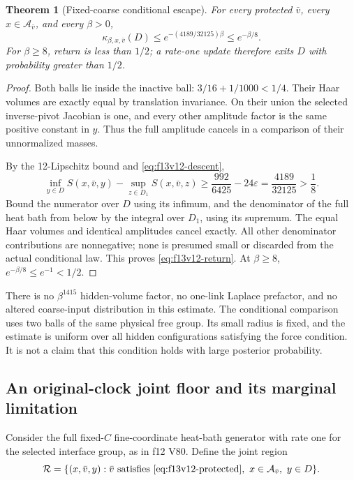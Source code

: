 \documentclass[11pt,oneside]{article}
\newtheorem{theorem}{Theorem}[section]
\begin{document}
\begin{theorem}[Fixed-coarse conditional escape]
\label{thm:f13v12-return}
For every protected \(\bar v\), every
\(x\in\mathcal A_{\bar v}\), and every \(\beta>0\),
\begin{equation}\label{eq:f13v12-return}
 \kappa_{\beta,x,\bar v}(D)
 \le e^{-(4189/32125)\beta}
 \le e^{-\beta/8}.
\end{equation}
For \(\beta\ge8\), return is less than \(1/2\);
a rate-one update therefore exits \(D\) with
probability greater than \(1/2\).
\end{theorem}

\begin{proof}
Both balls lie inside the inactive ball:
\(3/16+1/1000<1/4\).
Their Haar volumes are exactly equal by
translation invariance. On their union the
selected inverse-pivot Jacobian is one, and
every other amplitude factor is the same
positive constant in \(y\). Thus the full
amplitude cancels in a comparison of their
unnormalized masses.

By the 12-Lipschitz bound and
\eqref{eq:f13v12-descent},
\[
 \inf_{y\in D}S(x,\bar v,y)
       -\sup_{z\in D_1}S(x,\bar v,z)
   \ge\frac{992}{6425}-24\varepsilon
   =\frac{4189}{32125}>\frac18.
\]
Bound the numerator over \(D\) using its
infimum, and the denominator of the full heat
bath from below by the integral over \(D_1\),
using its supremum. The equal Haar volumes
and identical amplitudes cancel exactly.
All other denominator contributions are
nonnegative; none is presumed small or
discarded from the actual conditional law.
This proves \eqref{eq:f13v12-return}.
At \(\beta\ge8\), \(e^{-\beta/8}\le e^{-1}<1/2\).
\end{proof}

There is no \(\beta^{1415}\) hidden-volume factor,
no one-link Laplace prefactor, and no altered
coarse-input distribution in this estimate.
The conditional comparison uses two balls of
the same physical free group. Its small radius
is fixed, and the estimate is uniform over all
hidden configurations satisfying the force
condition. It is not a claim that this condition
holds with large posterior probability.

\subsection{An original-clock joint floor and its marginal limitation}

Consider the full fixed-\(C\) fine-coordinate
heat-bath generator with rate one for the
selected interface group, as in f12 V80.
Define the joint region
\[
 \mathcal R=
 \{(x,\bar v,y):\bar v\text{ satisfies }
   \eqref{eq:f13v12-protected},\
                 x\in\mathcal A_{\bar v},\ y\in D\}.
\]
\end{document}
